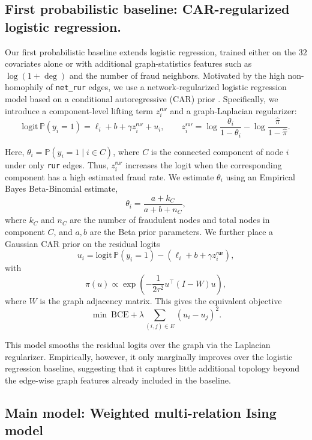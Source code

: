 \documentclass[11pt,reqno]{amsart}
\begin{document}
\subsection{First probabilistic baseline: CAR-regularized logistic regression.}

Our first probabilistic baseline extends logistic regression, trained either on the $32$ covariates alone or with additional graph-statistics features such as $\log(1+\deg)$ and the number of fraud neighbors. Motivated by the high non-homophily of \texttt{net\_rur} edges, we use a network-regularized logistic regression model based on a conditional autoregressive (CAR) prior \cite{Brown_2018}. Specifically, we introduce a component-level lifting term $z_i^{\textsf{rur}}$ and a graph-Laplacian regularizer:
\[
\text{logit}\,\mathbb P(y_i=1)
=
\ell_i + b + \gamma z_i^{\textsf{rur}} + u_i,
\qquad
z_i^{\textsf{rur}}
=
\log\frac{\theta_i}{1-\theta_i}
-
\log\frac{\widehat \pi}{1-\widehat \pi}.
\]

Here, $\theta_i=\mathbb P(y_i=1\mid i\in C)$, where $C$ is the connected component of node $i$ under only \texttt{rur} edges. Thus, $z_i^{\textsf{rur}}$ increases the logit when the corresponding component has a high estimated fraud rate. We estimate $\theta_i$ using an Empirical Bayes Beta-Binomial estimate,
\[
\theta_i = \frac{a+k_C}{a+b+n_C},
\]
where $k_C$ and $n_C$ are the number of fraudulent nodes and total nodes in component $C$, and $a,b$ are the Beta prior parameters. We further place a Gaussian CAR prior on the residual logits
\[
u_i
=
\text{logit}\,\mathbb P(y_i=1)
-
(\ell_i+b+\gamma z_i^{\textsf{rur}}),
\]
with
\[
\pi(u)
\propto
\exp\left(
-\frac{1}{2\tau^2}u^\top(I-W)u
\right),
\]
where $W$ is the graph adjacency matrix. This gives the equivalent objective
\[
\min \ \mathrm{BCE}
+
\lambda \sum_{(i,j)\in E}(u_i-u_j)^2.
\]

This model smooths the residual logits over the graph via the Laplacian regularizer. Empirically, however, it only marginally improves over the logistic regression baseline, suggesting that it captures little additional topology beyond the edge-wise graph features already included in the baseline.

\subsection{Main model: Weighted multi-relation Ising model} 
\end{document}
